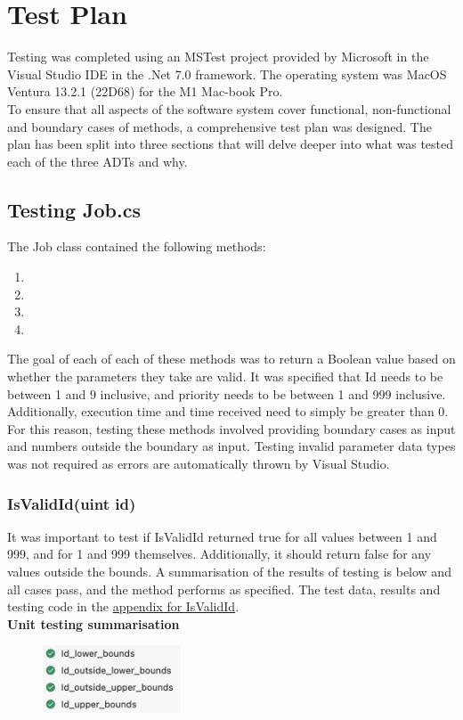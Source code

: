 \documentclass[a4paper]{article}
\begin{document}
\section{Test Plan}
Testing was completed using an MSTest project provided by Microsoft in the Visual Studio IDE in the .Net 7.0 framework. The operating system was MacOS Ventura 13.2.1 (22D68) for the M1 Mac-book Pro.
\\[6pt]
To ensure that all aspects of the software system cover functional, non-functional and boundary cases of methods, a comprehensive test plan was designed. 
The plan has been split into three sections that will delve deeper into what was tested each of the three ADTs and why.

\subsection{Testing Job.cs}
The Job class contained the following methods:
\begin{enumerate}
   \item {}
   \item {}
   \item {}
   \item {}
\end{enumerate}
The goal of each of each of these methods was to return a Boolean value based on whether the parameters they take are valid. It was specified that Id needs to be between 1 and 9 inclusive, and priority needs to be between 1 and 999 inclusive. Additionally, execution time and time received need to simply be greater than 0.
\\[6pt]
For this reason, testing these methods involved providing boundary cases as input and numbers outside the boundary as input. Testing invalid parameter data types was not required as errors are automatically thrown by Visual Studio.

\subsubsection{IsValidId(uint id)}
It was important to test if IsValidId returned true for all values between 1 and 999, and for 1 and 999 themselves. Additionally, it should return false for any values outside the bounds. A summarisation of the results of testing is below and all cases pass, and the method performs as specified. The test data, results and testing code in the \hyperlink{subsubsection.5.1.1}{appendix for IsValidId}.
\\[6pt]
\textbf{Unit testing summarisation}
\begin{figure}[H]
   \includegraphics[height=2cm]{images/IsValidId-summary.png}
\end{figure}
\end{document}
